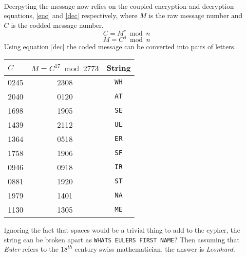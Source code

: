 \documentclass[11pt]{article}
\begin{document}
\paragraph*{}
Decrpyting the message now relies on the coupled encryption and decryption equations, \ref{enc} and \ref{dec}
respectively, where $M$ is the raw message number and $C$ is the codded message number.
\begin{equation} \label{enc}
	C = M^e \bmod n
\end{equation}
\begin{equation} \label{dec}
	M = C^d \bmod n
\end{equation}
Using equation \ref{dec} the coded message can be converted into pairs of letters. 
\begin{center}
\begin{tabular}{l|c|c}
	$C$ & $M = C^{17} \bmod 2773$ & String \\ \hline \hline
	0245 & 2308 & \texttt{WH} \\
	2040 & 0120 & \texttt{AT} \\
	1698 & 1905 & \texttt{SE} \\
	1439 & 2112 & \texttt{UL} \\
	1364 & 0518 & \texttt{ER} \\
	1758 & 1906 & \texttt{SF} \\
	0946 & 0918 & \texttt{IR} \\
	0881 & 1920 & \texttt{ST} \\
	1979 & 1401 & \texttt{NA} \\
	1130 & 1305 & \texttt{ME}
\end{tabular} 
\end{center}
Ignoring the fact that spaces would be a trivial thing to add to the cypher, the string can be broken
apart as \texttt{WHATS EULERS FIRST NAME}? Then assuming that \emph{Euler} refers to the $18^{th}$ century 
swiss mathematician, the answer is \emph{Leonhard}.
\end{document}
